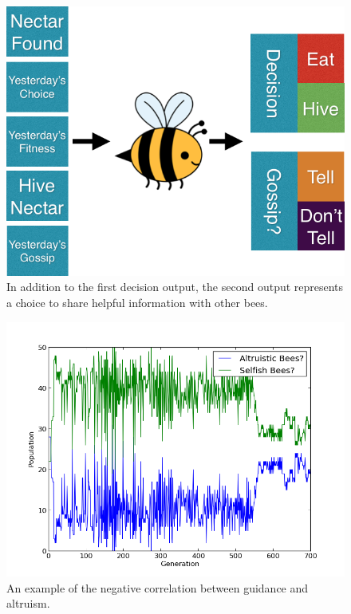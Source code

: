 \documentclass[11pt]{article}
\begin{document}
			\begin{figure}[tb]
				\begin{center}
					\includegraphics[scale=.5]{bee_diagrams/gossip_system.png}
				\end{center}
				\caption{In addition to the first decision output, the second output represents a choice to share helpful information with other bees.}
				\label{fig:gossip_system}
			\end{figure}

                        \begin{figure}[tb]
				\begin{center}
					\includegraphics[scale=.75]{results/gossip_plot_twist_comp.png}
				\end{center}
				\caption{An example of the negative correlation between guidance and altruism.}
				\label{fig:recurrent_composition}
			\end{figure}
\end{document}
